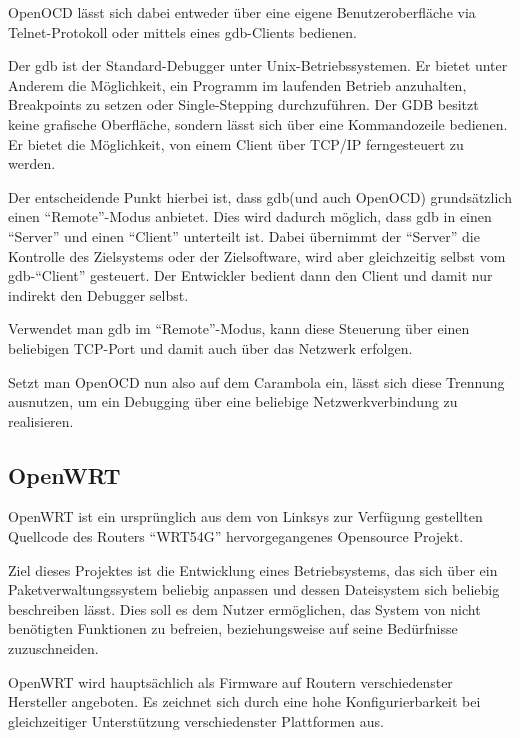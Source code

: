 OpenOCD lässt sich dabei entweder über eine eigene Benutzeroberfläche via
Telnet-Protokoll oder mittels eines \gls{gdb}-Clients bedienen.

\begin{definition}[GDB]
Der \gls{gdb} ist der Standard-Debugger unter
Unix-Betriebssystemen. Er bietet unter Anderem die Möglichkeit, ein Programm im
laufenden Betrieb anzuhalten, Breakpoints zu setzen oder Single-Stepping
durchzuführen. Der GDB besitzt keine grafische Oberfläche, sondern
lässt sich über eine Kommandozeile bedienen. Er bietet die Möglichkeit, von
einem Client über TCP/IP ferngesteuert zu werden. 
\end{definition}

Der entscheidende Punkt hierbei ist, dass \gls{gdb}(und auch OpenOCD)
grundsätzlich einen "`Remote"'-Modus anbietet. Dies wird dadurch möglich, dass
\gls{gdb} in einen "`Server"' und einen "`Client"' unterteilt ist. Dabei
übernimmt der "`Server"' die Kontrolle des Zielsystems oder der Zielsoftware,
wird aber gleichzeitig selbst vom \gls{gdb}-"`Client"' gesteuert. Der Entwickler
bedient dann den Client und damit nur indirekt den Debugger selbst.

Verwendet man \gls{gdb} im "`Remote"'-Modus, kann diese Steuerung über einen
beliebigen TCP-Port und damit auch über das Netzwerk erfolgen.

Setzt man OpenOCD nun also auf dem Carambola ein, lässt sich diese Trennung
ausnutzen, um ein Debugging über eine beliebige Netzwerkverbindung zu
realisieren.
\subsection{OpenWRT}
OpenWRT ist ein ursprünglich aus dem von Linksys zur Verfügung
gestellten Quellcode des Routers "`WRT54G"' \cite{OWRT} hervorgegangenes
Opensource Projekt.

Ziel dieses Projektes ist die Entwicklung eines Betriebsystems, das sich
über ein Paketverwaltungssystem beliebig anpassen und dessen Dateisystem sich
beliebig beschreiben lässt. Dies soll es dem Nutzer ermöglichen, das System von
nicht benötigten Funktionen zu befreien, beziehungsweise auf seine Bedürfnisse
zuzuschneiden.

OpenWRT wird hauptsächlich als Firmware auf Routern verschiedenster Hersteller
angeboten. Es zeichnet sich durch eine hohe Konfigurierbarkeit bei
gleichzeitiger Unterstützung verschiedenster Plattformen aus.
